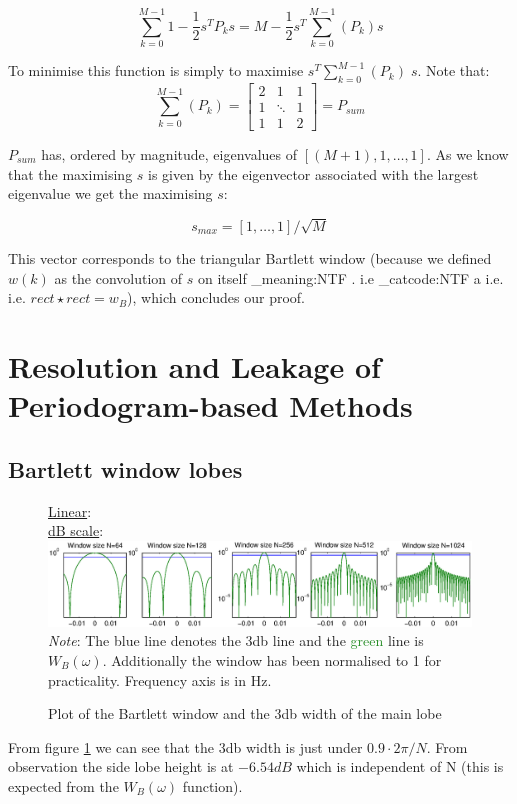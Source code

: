\documentclass[10pt,twoside,a4paper]{report}
\makeatletter
\newcommand\latinabbrev[1]{
  \peek_meaning:NTF . {%
    #1\@}%
  { \peek_catcode:NTF a {%
      #1.\@ }%
    {#1.\@}}}
\makeatother
\begin{document}
$$ \sum_{k=0}^{M-1} 1-  \frac{1}{2} s^T P_k s  = M - \frac{1}{2} s^T  \sum_{k=0}^{M-1} \left( P_k \right) s $$

To minimise this function is simply to maximise $s^T \sum_{k=0}^{M-1} (P_k) \; s$. Note that:
$$\sum_{k=0}^{M-1} (P_k) = \begin{bmatrix} 2 & 1 & 1\\ 1 & \ddots & 1\\ 1 & 1 & 2\end{bmatrix} = P_{sum}$$

$P_{sum}$ has, ordered by magnitude, eigenvalues of $\left[ (M+1),1, \dots, 1\right]$. As we know that the maximising $s$ is given by the eigenvector associated with the largest eigenvalue\cite{rayleigh} we get the maximising $s$:

$$s_{max} = \left[1, \dots, 1\right]/\sqrt{M}$$

This vector corresponds to the triangular Bartlett window (because we defined $w(k)$ as the convolution of $s$ on itself \latinabbrev{i.e} $rect \star rect = w_B$), which concludes our proof.
\section{Resolution and Leakage of Periodogram-based Methods}
\subsection{Bartlett window lobes}
\begin{figure}[h!]
\centering
\underline{Linear}:\\
\resizebox{\textwidth}{!}{}
\underline{dB scale}:\\
\includegraphics[width=\textwidth]{cw1im/3adb.eps}
\textit{Note}: The \textcolor{NavyBlue}{blue} line denotes the 3db line and the \textcolor{ForestGreen}{green} line is $W_B(\omega)$. Additionally the window has been normalised to 1 for practicality. Frequency axis is in Hz.
\label{fig:bartlettwid}
\caption{Plot of the Bartlett window and the 3db width of the main lobe}
\end{figure}
From figure \ref{fig:bartlettwid} we can see that the 3db width is just under $0.9 \cdot 2\pi/N$. From observation the side lobe height  is at $-6.54 dB$ which is independent of N (this is expected from the $W_B(\omega)$ function).
\end{document}
